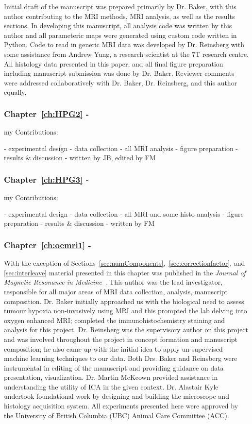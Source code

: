 Initial draft of the manuscript was prepared primarily by Dr. Baker, with this author contributing to the MRI methods, MRI analysis, as well as the results sections. 
In developing this manuscript, all analysis code was written by this author and all parameteric maps were generated using custom code written in Python.
Code to read in generic MRI data was developed by Dr. Reinsberg with some assistance from Andrew Yung, a research scientist at the 7T research centre.
All histology data presented in this paper, and all final figure preparation  including manuscript submission was done by Dr. Baker.
Reviewer comments were addressed collaboratively with Dr. Baker, Dr. Reinsberg, and this author equally. 

\subsubsection{Chapter~\ref{ch:HPG2} - }

my Contributions:

- experimental design
- data collection
- all MRI analysis
- figure preparation
- results & discussion
- written by JB, edited by FM

\subsubsection{Chapter~\ref{ch:HPG3} - }

my Contributions:

- experimental design
- data collection
- all MRI and some histo analysis
- figure preparation
- results & discussion
- written by FM

\subsubsection{Chapter~\ref{ch:oemri1} - }

With the exception of Sections~\ref{sec:numComponents},~\ref{sec:correctionfactor}, and \ref{sec:interleave} material presented in this chapter was published in the \textit{Journal of Magnetic Resonance in Medicine}~\cite{Moosvi:2018ca}. 
This author was the lead investigator, responsible for all major areas of MRI data collection, analysis, manuscript composition. 
Dr. Baker initially approached us with the biological need to assess tumour hypoxia non-invasively using MRI and this prompted the lab delving into oxygen enhanced MRI; completed the immunohistochemistry staining and analysis for this project.
Dr. Reinsberg was the supervisory author on this project and was involved throughout the project in concept formation and manuscript composition; he also came up with the initial idea to apply un-supervised machine learning techniques to our data. 
Both Drs. Baker and Reinsberg were instrumental in editing of the manuscript and providing guidance on data presentation, visualization.
Dr. Martin McKeown provided assistance in understanding the utility of \ac{ICA} in the given context. 
Dr. Alastair Kyle undertook foundational work by designing and building the microscope and histology acquisition system. 
All experiments presented here were approved by the University of British Columbia (UBC) Animal Care Committee (ACC).


